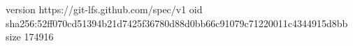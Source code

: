 version https://git-lfs.github.com/spec/v1
oid sha256:52ff070cd51394b21d7425f36780d88d0bb66c91079c71220011c4344915d8bb
size 174916

